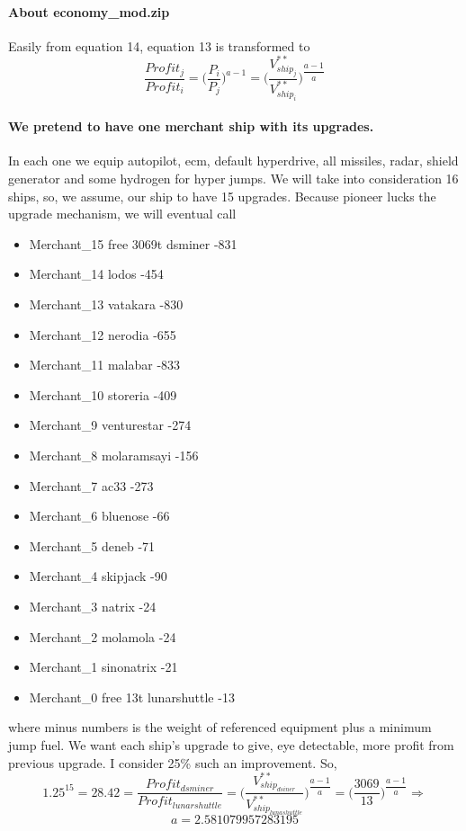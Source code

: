 \documentclass[]{article}
\begin{document}
	\paragraph{About economy\_mod.zip}
	Easily from equation 14, equation 13 is transformed to
	\begin{equation}\label{eq:profitRatio_ij}
		\dfrac{Profit_{j}}{Profit_{i}}=\Big(\dfrac{P_{i}}{P_{j}}\Big)^{a-1}=\Big(\dfrac{V^{**}_{ship_{j}}}{V^{**}_{ship_{i}}}\Big)^{\dfrac{a-1}{a}}
	\end{equation}
\paragraph{We pretend to have one merchant ship with its upgrades.} In each one we equip autopilot, ecm, default hyperdrive, all missiles, radar, shield generator and some hydrogen for hyper jumps. We will take into consideration 16 ships, so, we assume, our ship  to have 15 upgrades.
Because pioneer lucks the upgrade mechanism, we will eventual call 
\begin{itemize}
\item Merchant\_15 free 3069t	dsminer -831
\item Merchant\_14 	lodos -454
\item Merchant\_13 	vatakara -830
\item Merchant\_12	nerodia -655
\item Merchant\_11	malabar -833
\item Merchant\_10	storeria -409
\item Merchant\_9	venturestar -274
\item Merchant\_8	molaramsayi -156
\item Merchant\_7	ac33 -273
\item Merchant\_6 	bluenose -66
\item Merchant\_5	deneb -71
\item Merchant\_4	skipjack -90
\item Merchant\_3	natrix -24
\item Merchant\_2	molamola -24
\item Merchant\_1	sinonatrix -21
\item Merchant\_0 free 13t	lunarshuttle -13
\end{itemize}
where minus numbers is the weight of referenced equipment plus a minimum jump fuel.
We want each ship's upgrade to give, eye detectable, more profit from previous upgrade. I consider 25\% such an improvement. So, \[1.25^{15}=28.42=\frac{Profit_{dsminer}}{Profit_{lunarshuttle}}=\Big(\dfrac{V^{**}_{ship_{dsiner}}}{V^{**}_{ship_{lunashuttle}}}\Big)^{\dfrac{a-1}{a}}=\Big(\dfrac{3069}{13}\Big)^{\dfrac{a-1}{a}}\Rightarrow\]\[a=2.581079957283195\]
\end{document}
